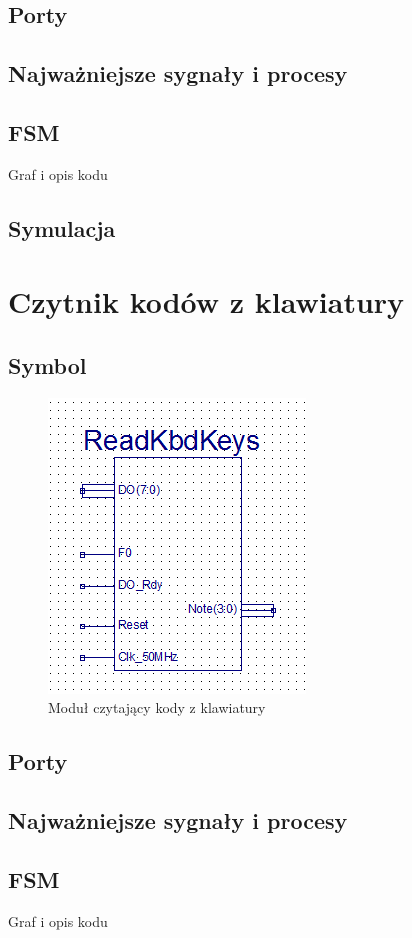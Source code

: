 \documentclass[a4paper]{report}
\begin{document}
		\subsection{Porty}
		\subsection{Najważniejsze sygnały i procesy}
		\subsection{FSM}
		Graf i opis kodu
		\subsection{Symulacja}
	\section{Czytnik kodów z klawiatury}
		\subsection{Symbol}
			\begin{figure}[h!]
				\centering
				\includegraphics{readkbdkeys2.png}
				\caption{Moduł czytający kody z klawiatury}
			\end{figure}
		\subsection{Porty}
			
		\subsection{Najważniejsze sygnały i procesy}
		\subsection{FSM}
		Graf i opis kodu
\end{document}
